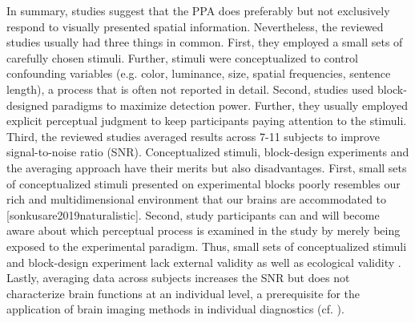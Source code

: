 \documentclass[english]{article}
\begin{document}
In summary, studies suggest that the PPA does preferably but not exclusively
respond to visually presented spatial information.
Nevertheless, the reviewed studies usually had three things in common.
First, they employed a small sets of carefully chosen stimuli. Further, stimuli
were conceptualized to control confounding variables (e.g. color, luminance,
size, spatial frequencies, sentence length), a process that is often not
reported in detail.
Second, studies used block-designed paradigms to maximize detection power.
Further, they usually employed explicit perceptual judgment to keep participants
paying attention to the stimuli.
Third, the reviewed studies averaged results across 7-11 subjects to improve
signal-to-noise ratio (SNR).
Conceptualized stimuli, block-design experiments and the averaging approach have
their merits but also disadvantages.
First, small sets of conceptualized stimuli presented on experimental blocks
poorly resembles our rich and multidimensional environment that our brains are
accommodated to [sonkusare2019naturalistic].
Second, study participants can and will become aware about which perceptual
process is examined in the study by merely being exposed to the experimental
paradigm.
Thus, small sets of conceptualized stimuli and block-design experiment lack
external validity \citep{westfall2016fixing} as well as ecological validity
\citep{hasson2004intersubject}.
Lastly, averaging data across subjects increases the SNR but does not
characterize brain functions at an individual level, a prerequisite for the
application of brain imaging methods in individual diagnostics (cf.
\cite{dubois2016building, eickhoff2020towards}).
\end{document}
